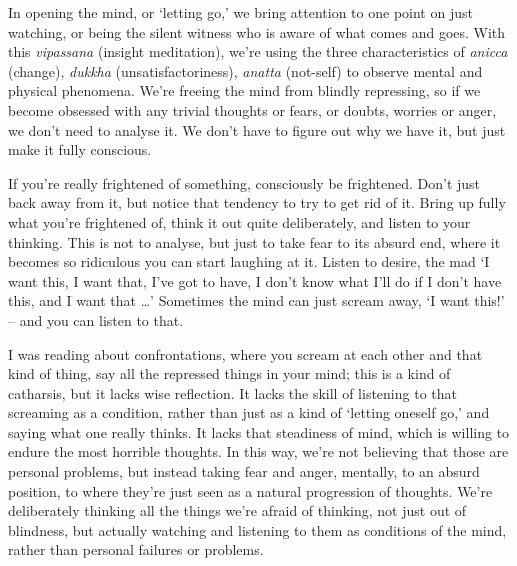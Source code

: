 
In opening the mind, or `letting go,' we bring attention to one point on just watching, or being the silent witness who is aware of what comes and goes. With this \textit{vipassana} (insight meditation), we're using the three characteristics of \textit{anicca} (change), \textit{dukkha} (unsatisfactoriness), \textit{anatta} (not-self) to observe mental and physical phenomena. We're freeing the mind from blindly repressing, so if we become obsessed with any trivial thoughts or fears, or doubts, worries or anger, we don't need to analyse it. We don't have to figure out why we have it, but just make it fully conscious.

If you're really frightened of something, consciously be frightened. Don't just back away from it, but notice that tendency to try to get rid of it. Bring up fully what you're frightened of, think it out quite deliberately, and listen to your thinking. This is not to analyse, but just to take fear to its absurd end, where it becomes so ridiculous you can start laughing at it. Listen to desire, the mad `I want this, I want that, I've got to have, I don't know what I'll do if I don't have this, and I want that \ldots{}' Sometimes the mind can just scream away, `I want this!' -- and you can listen to that.

I was reading about confrontations, where you scream at each other and that kind of thing, say all the repressed things in your mind; this is a kind of catharsis, but it lacks wise reflection. It lacks the skill of listening to that screaming as a condition, rather than just as a kind of `letting oneself go,' and saying what one really thinks. It lacks that steadiness of mind, which is willing to endure the most horrible thoughts. In this way, we're not believing that those are personal problems, but instead taking fear and anger, mentally, to an absurd position, to where they're just seen as a natural progression of thoughts. We're deliberately thinking all the things we're afraid of thinking, not just out of blindness, but actually watching and listening to them as conditions of the mind, rather than personal failures or problems.


